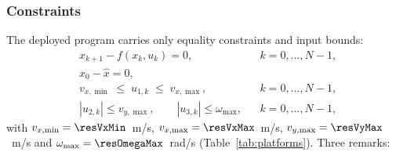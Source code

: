 \documentclass[11pt,a4paper]{article}
\begin{document}
\subsubsection{Constraints}
\label{sec:constraints}

The deployed program carries only equality constraints and input bounds:
\begin{subequations}
\label{eq:cons}
\begin{align}
  & x_{k+1}-f(x_k,u_k)=0, && k=0,\dots,N-1, \label{eq:cons-dyn}\\
  & x_0-\hat x=0, \label{eq:cons-init}\\
  & v_{x,\min}\;\le\;u_{1,k}\;\le\;v_{x,\max}, && k=0,\dots,N-1, \label{eq:cons-vx}\\
  & |u_{2,k}|\le v_{y,\max},\qquad |u_{3,k}|\le\omega_{\max}, && k=0,\dots,N-1, \label{eq:cons-vyw}
\end{align}
\end{subequations}
with $v_{x,\min}=\resVxMin$~m/s, $v_{x,\max}=\resVxMax$~m/s, $v_{y,\max}=\resVyMax$~m/s and
$\omega_{\max}=\resOmegaMax$~rad/s (Table~\ref{tab:platforms}). Three remarks:
\end{document}

